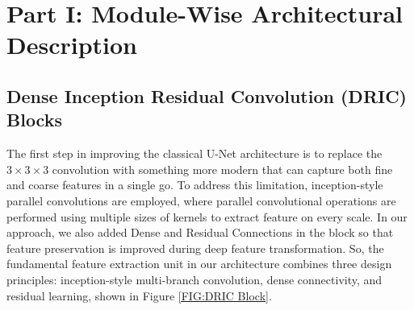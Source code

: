 
\section*{Part I: Module-Wise Architectural Description}

\subsection{Dense Inception Residual Convolution (DRIC) Blocks}

The first step in improving the classical U-Net architecture is to replace the $3\times3\times3$ convolution with something more modern that can capture both fine and coarse features in a single go. To address this limitation, inception-style parallel convolutions are employed, where parallel convolutional operations are performed using multiple sizes of kernels to extract feature on every scale. In our approach, we also added Dense and Residual Connections in the block so that feature preservation is improved during deep feature transformation. So, the fundamental feature extraction unit in our architecture combines three design principles: inception-style multi-branch convolution, dense connectivity, and residual learning, shown in Figure \ref{FIG:DRIC Block}.

